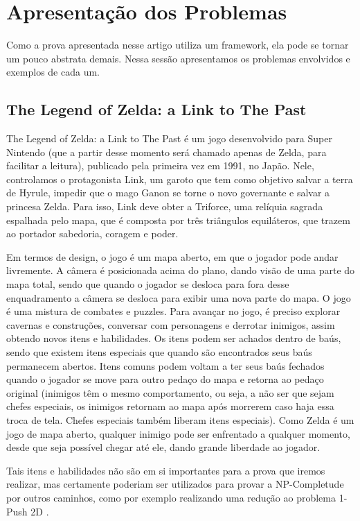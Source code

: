 \section{Apresentação dos Problemas}

Como a prova apresentada nesse artigo utiliza um framework, ela pode se
tornar um pouco abstrata demais. Nessa sessão apresentamos os problemas envolvidos e exemplos de cada um.

\subsection{The Legend of Zelda: a Link to The Past}

The Legend of Zelda: a Link to The Past é um jogo desenvolvido para Super Nintendo 
(que a partir desse momento será chamado apenas de Zelda, para facilitar a leitura), publicado pela
primeira vez em 1991, no Japão. Nele, controlamos o protagonista Link, um garoto que tem como objetivo
salvar a terra de Hyrule, impedir que o mago Ganon se torne o novo governante e salvar a princesa Zelda.
Para isso, Link deve obter a Triforce, uma relíquia sagrada espalhada pelo mapa, que é composta por 
três triângulos equiláteros, que trazem ao portador sabedoria, coragem e poder.

Em termos de design, o jogo é um mapa aberto, em que o jogador pode andar livremente. A câmera é posicionada acima
do plano, dando visão de uma parte do mapa total, sendo que quando o jogador se desloca para fora desse enquadramento
a câmera se desloca para exibir uma nova parte do mapa. O jogo é uma mistura de combates e puzzles. Para avançar
no jogo, é preciso explorar cavernas e construções, conversar com personagens e derrotar inimigos, assim obtendo
novos itens e habilidades. Os itens podem ser achados dentro de baús, sendo que existem itens especiais que quando são
encontrados seus baús permanecem abertos. Itens comuns podem voltam a ter seus baús fechados quando o jogador se move para
outro pedaço do mapa e retorna ao pedaço original (inimigos têm o mesmo comportamento, ou seja, a não ser que sejam chefes
especiais, os inimigos retornam ao mapa após morrerem caso haja essa troca de tela. Chefes especiais também liberam itens especiais).
Como Zelda é um jogo de mapa aberto, qualquer inimigo pode ser enfrentado a qualquer momento, desde que seja possível chegar até ele, dando grande liberdade ao jogador.

Tais itens e habilidades não são em si importantes para a prova que iremos realizar,
mas certamente poderiam ser utilizados para provar a NP-Completude por outros caminhos, como por exemplo realizando
uma redução ao problema 1-Push 2D \cite{demaine2000pushpush}.


